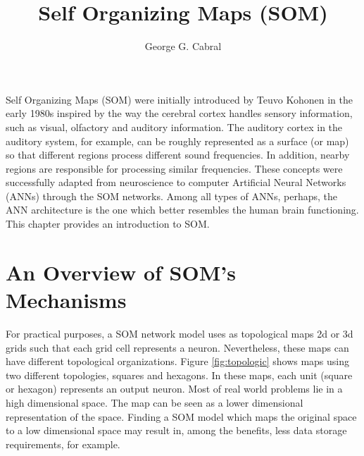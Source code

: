 \title{Self Organizing Maps (SOM)}
\label{chp:self-organizing-maps}
\author{George G. Cabral}




\maketitle



Self Organizing Maps (SOM) were initially introduced by Teuvo Kohonen \cite{kohonen:1982,khonen:1990} in the early 1980s inspired by the way the cerebral cortex handles sensory information, such as visual, olfactory and auditory information. The auditory cortex in the auditory system, for example, can be roughly represented as a surface (or map) so that different regions process different sound frequencies. In addition, nearby regions are responsible for processing similar frequencies. These concepts were successfully adapted from neuroscience to computer Artificial Neural Networks (ANNs) through the SOM networks. Among all types of ANNs, perhaps, the ANN architecture is the one which better resembles the human brain functioning. This chapter provides an introduction to SOM.

\section{An Overview of SOM's Mechanisms}

For practical purposes, a SOM network model uses as topological maps 2d or 3d grids such that each grid cell represents a neuron. Nevertheless, these maps can have different topological organizations. Figure \ref{fig:topologic} shows maps using two different topologies, squares and hexagons. In these maps, each unit (square or hexagon) represents an output neuron. %
 Most of real world problems lie in a high dimensional space. The map can be seen as a lower dimensional representation of the space. Finding a SOM model which maps the original space to a low dimensional space may result in, among the benefits, less data storage requirements, for example.

